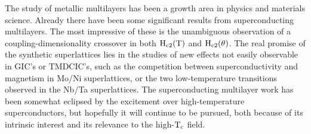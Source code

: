         The study of metallic multilayers has been a growth area in physics
and materials science.\cite{mrs87} Already there have been some significant
results from superconducting multilayers.  The most impressive  of these is
the unambiguous observation of a  coupling-dimensionality crossover in both
$\rm                H_{c2}(T)$              and                        $\rm
H_{c2}(\theta)$.\cite{ruggiero82,chun84,kanoda86,broussard87}     The  real
promise  of the synthetic superlattices lies  in the studies of new effects
not easily observable in GIC's or TMDCIC's, such as the com\-pe\-ti\-tion be\-tween
su\-per\-con\-duct\-ivity and mag\-net\-ism in Mo/Ni su\-per\-latt\-ices,\cite{uher86} or the
two     low-temperature    transitions    observed     in    the      Nb/Ta
superlattices.\cite{broussard87}  The superconducting multilayer work   has
been   somewhat   eclipsed    by  the   excitement  over   high-temperature
superconductors, but hopefully it will continue to be pursued, both because
of its intrinsic interest and its relevance to the high-$\rm T_c$ field.

